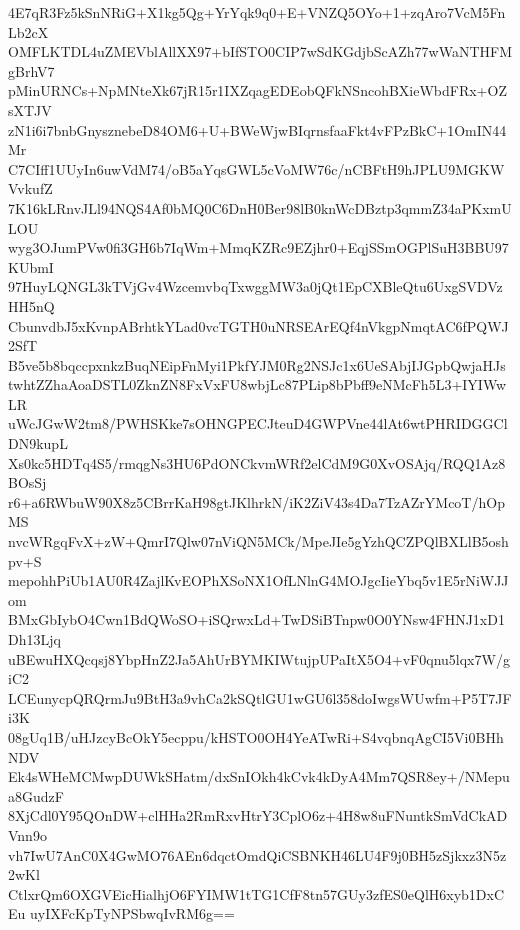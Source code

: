 4E7qR3Fz5kSnNRiG+X1kg5Qg+YrYqk9q0+E+VNZQ5OYo+1+zqAro7VcM5FnLb2cX
OMFLKTDL4uZMEVblAllXX97+bIfSTO0CIP7wSdKGdjbScAZh77wWaNTHFMgBrhV7
pMinURNCs+NpMNteXk67jR15r1IXZqagEDEobQFkNSncohBXieWbdFRx+OZsXTJV
zN1i6i7bnbGnysznebeD84OM6+U+BWeWjwBIqrnsfaaFkt4vFPzBkC+1OmIN44Mr
C7CIff1UUyIn6uwVdM74/oB5aYqsGWL5cVoMW76c/nCBFtH9hJPLU9MGKWVvkufZ
7K16kLRnvJLl94NQS4Af0bMQ0C6DnH0Ber98lB0knWcDBztp3qmmZ34aPKxmULOU
wyg3OJumPVw0fi3GH6b7IqWm+MmqKZRc9EZjhr0+EqjSSmOGPlSuH3BBU97KUbmI
97HuyLQNGL3kTVjGv4WzcemvbqTxwggMW3a0jQt1EpCXBleQtu6UxgSVDVzHH5nQ
CbunvdbJ5xKvnpABrhtkYLad0vcTGTH0uNRSEArEQf4nVkgpNmqtAC6fPQWJ2SfT
B5ve5b8bqccpxnkzBuqNEipFnMyi1PkfYJM0Rg2NSJc1x6UeSAbjIJGpbQwjaHJs
twhtZZhaAoaDSTL0ZknZN8FxVxFU8wbjLc87PLip8bPbff9eNMcFh5L3+IYIWwLR
uWcJGwW2tm8/PWHSKke7sOHNGPECJteuD4GWPVne44lAt6wtPHRIDGGClDN9kupL
Xs0kc5HDTq4S5/rmqgNs3HU6PdONCkvmWRf2elCdM9G0XvOSAjq/RQQ1Az8BOsSj
r6+a6RWbuW90X8z5CBrrKaH98gtJKlhrkN/iK2ZiV43s4Da7TzAZrYMcoT/hOpMS
nvcWRgqFvX+zW+QmrI7Qlw07nViQN5MCk/MpeJIe5gYzhQCZPQlBXLlB5oshpv+S
mepohhPiUb1AU0R4ZajlKvEOPhXSoNX1OfLNlnG4MOJgcIieYbq5v1E5rNiWJJom
BMxGbIybO4Cwn1BdQWoSO+iSQrwxLd+TwDSiBTnpw0O0YNsw4FHNJ1xD1Dh13Ljq
uBEwuHXQcqsj8YbpHnZ2Ja5AhUrBYMKIWtujpUPaItX5O4+vF0qnu5lqx7W/giC2
LCEunycpQRQrmJu9BtH3a9vhCa2kSQtlGU1wGU6l358doIwgsWUwfm+P5T7JFi3K
08gUq1B/uHJzcyBcOkY5ecppu/kHSTO0OH4YeATwRi+S4vqbnqAgCI5Vi0BHhNDV
Ek4sWHeMCMwpDUWkSHatm/dxSnIOkh4kCvk4kDyA4Mm7QSR8ey+/NMepua8GudzF
8XjCdl0Y95QOnDW+clHHa2RmRxvHtrY3CplO6z+4H8w8uFNuntkSmVdCkADVnn9o
vh7IwU7AnC0X4GwMO76AEn6dqctOmdQiCSBNKH46LU4F9j0BH5zSjkxz3N5z2wKl
CtlxrQm6OXGVEicHialhjO6FYIMW1tTG1CfF8tn57GUy3zfES0eQlH6xyb1DxCEu
uyIXFcKpTyNPSbwqIvRM6g==
